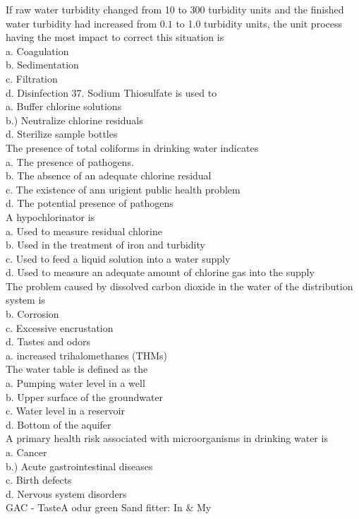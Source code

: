 If raw water turbidity changed from 10 to 300 turbidity units and the finished water turbidity had increased from $0.1$ to 1.0 turbidity units, the unit process having the most impact to correct this situation is\\
a. Coagulation\\
b. Sedimentation\\
c. Filtration\\
d. Disinfection 37. Sodium Thiosulfate is used to\\
a. Buffer chlorine solutions\\
b.) Neutralize chlorine residuals\\
d. Sterilize sample bottles\\

The presence of total coliforms in drinking water indicates\\
a. The presence of pathogens.\\
b. The absence of an adequate chlorine residual\\
c. The existence of ann urigient public health problem\\
d. The potential presence of pathogens\\

A hypochlorinator is\\
a. Used to measure residual chlorine\\
b. Used in the treatment of iron and turbidity\\
c. Used to feed a liquid solution into a water supply\\
d. Used to measure an adequate amount of chlorine gas into the supply\\

The problem caused by dissolved carbon dioxide in the water of the distribution system is\\
b.  Corrosion\\
c. Excessive encrustation\\
d. Tastes and odors\\
a. increased trihalomethanes (THMs)\\

The water table is defined as the\\
a. Pumping water level in a well\\
b.  Upper surface of the groundwater\\
c. Water level in a reservoir\\
d. Bottom of the aquifer\\

A primary health risk associated with microorganisms in drinking water is\\
a. Cancer\\
b.) Acute gastrointestinal diseases\\
c. Birth defects\\
d. Nervous system disorders\\
GAC - TasteA odur green Sand fitter: In \& My\\

